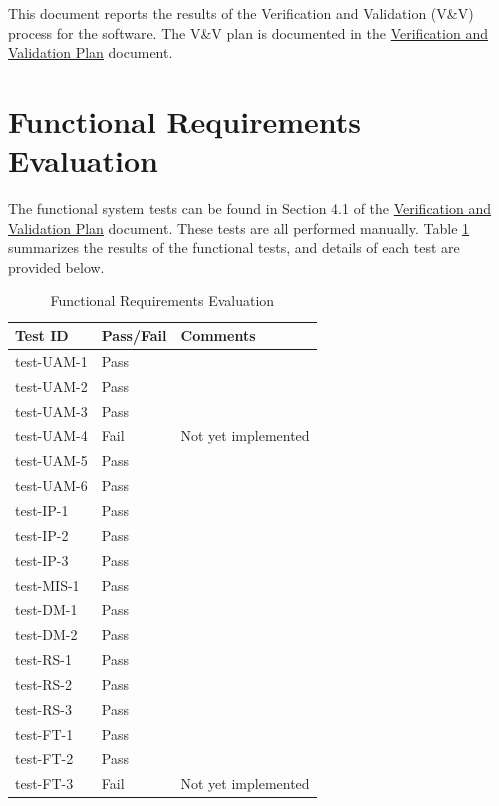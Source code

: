 \documentclass[12pt, titlepage]{article}
\begin{document}
\newpage

\tableofcontents

\listoftables %

\listoffigures %

\newpage


This document reports the results of the Verification and Validation (V\&V)
process for the \progname software. The V\&V plan is documented in the
\href{https://github.com/PlutosCapstone/Plutos/blob/main/docs/VnVPlan/VnVPlan.pdf}{Verification
and Validation Plan} document. 

\section{Functional Requirements Evaluation}

The functional system tests can be found in Section 4.1 of the
\href{https://github.com/PlutosCapstone/Plutos/blob/main/docs/VnVPlan/VnVPlan.pdf}{Verification
and Validation Plan} document. These tests are all performed manually. Table
\ref{tab:functional-requirements-evaluation} summarizes the results of the
functional tests, and details of each test are provided below.

\newpage

\begin{table}[h!]
\centering
\caption{Functional Requirements Evaluation}\label{tab:functional-requirements-evaluation}
\begin{tabularx}{\textwidth}{>{\centering\arraybackslash}X >{\centering\arraybackslash}X >{\centering\arraybackslash}X}
  \toprule
  \textbf{Test ID} & \textbf{Pass/Fail} & \textbf{Comments} \\
  \midrule
  test-UAM-1 & Pass &  \\
  test-UAM-2 & Pass &  \\
  test-UAM-3 & Pass &  \\
  test-UAM-4 & Fail & Not yet implemented \\
  test-UAM-5 & Pass &  \\
  test-UAM-6 & Pass &  \\
  \midrule
  test-IP-1 & Pass & \\
  test-IP-2 & Pass & \\
  test-IP-3 & Pass & \\
  \midrule
  test-MIS-1 & Pass & \\
  \midrule
  test-DM-1 & Pass & \\
  test-DM-2 & Pass & \\
  \midrule
  test-RS-1 & Pass & \\
  test-RS-2 & Pass & \\
  test-RS-3 & Pass & \\
  \midrule
  test-FT-1 & Pass & \\
  test-FT-2 & Pass & \\
  test-FT-3 & Fail & Not yet implemented \\
  \bottomrule
\end{tabularx}
\end{table}
\end{document}

